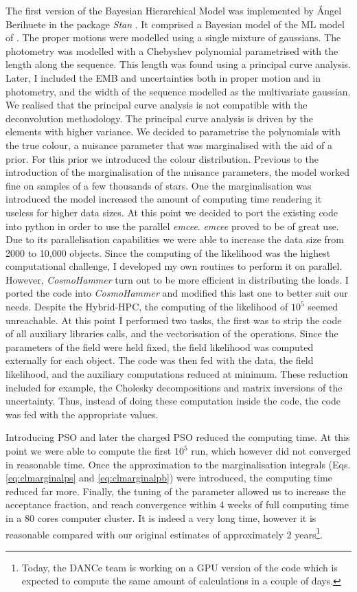 The first version of the Bayesian Hierarchical Model was implemented by \'Angel Berihuete in the package \emph{Stan} \citep{Stan}. It comprised a Bayesian model of the ML model of \citet{Sarro2014}. The proper motions were modelled using a single mixture of gaussians. The photometry was modelled with a Chebyshev polynomial parametrised with the length along the sequence. This length was found using a principal curve analysis. Later, I included the EMB and uncertainties both in proper motion and in photometry, and the width of the sequence modelled as the multivariate gaussian. We realised that the principal curve analysis is not compatible with the deconvolution methodology. The principal curve analysis is driven by the elements with higher variance. We decided to parametrise the polynomials with the true colour, a nuisance parameter that was marginalised with the aid of a prior. For this prior we introduced the colour distribution. Previous to the introduction of the marginalisation of the nuisance parameters, the model worked fine on samples of a few thousands of stars. One the marginalisation was introduced the model increased the amount of computing time rendering it useless for higher data sizes. At this point we decided to port the existing code into python in order to use the parallel \emph{emcee}. \emph{emcee} proved to be of great use. Due to its parallelisation capabilities we were able to increase the data size from 2000 to 10,000 objects. Since the computing of the likelihood was the highest computational challenge, I developed my own routines to perform it on parallel. However, \emph{CosmoHammer} \citep{Akeret2013} turn out to be more efficient in distributing the loads. I ported the code into \emph{CosmoHammer} and modified this last one to better suit our needs. Despite the Hybrid-HPC, the computing of the likelihood of $10^5$ seemed unreachable. At this point I performed two tasks, the first was to strip the code of all auxiliary libraries calls, and the vectorisation of the operations. Since the parameters of the field were held fixed, the field likelihood was computed externally for each object. The code was then fed with the data, the field likelihood, and the auxiliary computations reduced at minimum. These reduction included for example, the Cholesky decompositions and matrix inversions of the uncertainty. Thus, instead of doing these computation inside the code, the code was fed with the appropriate values.

Introducing PSO and later the charged PSO reduced the computing time.  At this point we were able to compute the first $10^5$ run, which however did not converged in reasonable time. Once the approximation to the marginalisation integrals (Eqs. \ref{eq:clmarginalps} and \ref{eq:clmarginalpb}) were introduced, the computing time reduced far more. Finally, the tuning of the parameter allowed us to increase the acceptance fraction, and reach convergence within 4 weeks of full computing time in a 80 cores computer cluster. It is indeed a very long time, however it is reasonable compared with our original estimates of approximately 2 years\footnote{Today, the DANCe team is working on a GPU version of the code which is expected to compute the same amount of calculations in a couple of days.}.

